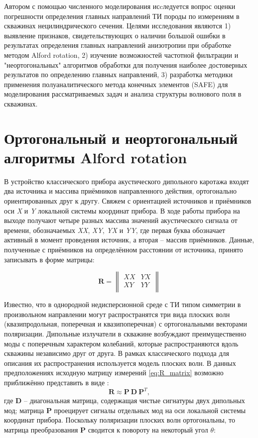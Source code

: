 \documentclass[a4paper,11pt]{article}
\begin{document}
Автором с помощью численного моделирования исcледуется вопрос оценки погрешности определения главных направлений ТИ породы по измерениям в скважинах нецилиндрического сечения. Целями исследования являются 1) выявление признаков, свидетельствующих о наличии большой ошибки в результатах определения главных направлений анизотропии при обработке методом Alford rotation, 2) изучение возможностей частотной фильтрации и "неортогональных" алгоритмов обработки для получения наиболее достоверных результатов по определению главных направлений, 3) разработка методики применения полуаналитического метода конечных элементов (SAFE) \cite{Bartoli2006} для моделирования рассматриваемых задач и анализа структуры волнового поля в скважинах. 

\section{Ортогональный и неортогональный алгоритмы Alford rotation}
В устройство классического прибора акустического дипольного каротажа входят два источника и массива приёмников направленного действия, ортогонально ориентированных друг к другу. Свяжем с ориентацией источников и приёмников оси \textit{X} и \textit{Y} локальной системы координат прибора. В ходе работы прибора на выходе получают четыре разных массива значений акустического сигнала от времени, обозначаемых \textit{XX}, \textit{XY}, \textit{YX} и \textit{YY}, где первая буква обозначает активный в момент проведения источник, а вторая -- массив приёмников. Данные, полученные с приёмников на определённом расстоянии от источника, принято записывать в форме матрицы: %

\begin{equation}
	\mathbf{R} = \left\|
	\begin{array}{cc}
	XX & YX \\
	XY & YY \\
	\end{array}
	\right\| 
	\label{eq:R_matrix}
\end{equation}

Известно, что в однородной недисперсионной среде с ТИ типом симметрии в произвольном направлении могут распространятся три вида плоских волн (квазипродольная, поперечная и квазипоперечная) с ортогональными векторами поляризации. Дипольные излучатели в скважине возбуждают преимущественно моды с поперечным характером колебаний, которые распространяются вдоль скважины независимо друг от друга. В рамках классического подхода для описания их распространения используется модель плоских волн.  В данных предположениях исходную матрицу измерений \eqref{eq:R_matrix} возможно приближённо представить в виде \cite{Dellinger1998}:
\begin{equation}
	\mathbf{R} \approx \mathbf{P} \ \mathbf{D} \ \mathbf{P}^T, \label{eq:alford_symmetric} 
\end{equation}
где $\mathbf{D}$ -- диагональная матрица, содержащая чистые сигнатуры двух дипольных мод; матрица $\mathbf{P}$ проецирует сигналы отдельных мод на оси локальной системы координат прибора. Поскольку поляризации плоских волн ортогональны, то матрица преобразования $\mathbf{P}$ сводится к повороту на некоторый угол $\theta$:
\end{document}
